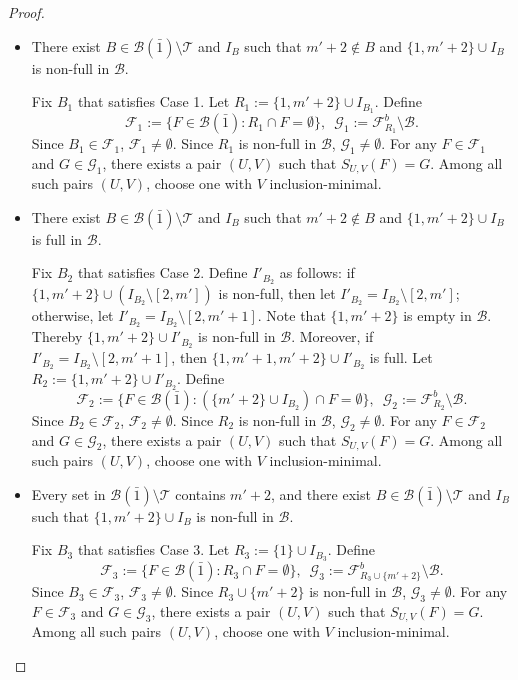 \documentclass[10pt,a4paper]{amsart}
\newcommand{\m}{\mathcal}
\begin{document}
\begin{proof}
\begin{itemize}
\item[Case 1.] There exist $B\in \m B(\bar{1})\setminus \m T$ and $I_B$ such that $m'+2\not\in B $ and  $\{1,m'+2\}\cup I_B$ is non-full in $\m B$. 

Fix $B_1$ that satisfies Case 1. 
Let $R_1:=\{1,m'+2\}\cup I_{B_1}$.
Define 
\begin{equation*}
    \m F_1:=\{F\in \m B(\bar1): R_1\cap F=\emptyset\}, \,\,\,
    \m G_1:=\m F_{R_1}^b\setminus \m B.
\end{equation*}
Since $B_1\in \m F_1$, $\m F_1\ne \emptyset$.
Since $R_1$ is non-full in $\m B$, $\m G_1\ne \emptyset$. 
For any $F\in \m F_1$ and $G\in \m G_1$, there exists a pair $(U,V)$ such that $S_{U,V}(F)=G$. Among all such pairs $(U,V)$, choose one with $V$ inclusion-minimal. 


\item[Case 2.] 
There exist $B\in \m B(\bar{1})\setminus \m T$ and $I_B$ such that $m'+2\not\in B $ and $\{1,m'+2\}\cup I_B$ is full in $\m B$. 

Fix $B_2$ that satisfies Case 2.
Define $I'_{B_2}$ as follows: 
if $\{1,m'+2\}\cup (I_{B_2}\setminus [2,m'])$ is non-full, then 
let $I'_{B_2}=I_{B_2}\setminus [2,m']$; otherwise, let $I'_{B_2}=I_{B_2}\setminus [2,m'+1]$. 
Note that $\{1,m'+2\}$ is empty in $\m B$. Thereby $\{1,m'+2\}\cup I'_{B_2}$ is non-full in $\m B$. Moreover, if $I'_{B_2}=I_{B_2}\setminus [2,m'+1]$, then $\{1,m'+1,m'+2\}\cup I'_{B_2}$ is full. 
Let $R_2:=\{1, m'+2\}\cup I'_{B_2}$.
Define 
\begin{equation*}
    \m F_2:=\{F\in \m B(\bar1): (\{m'+2\}\cup I_{B_2})\cap F=\emptyset\}, \,\,\,
    \m G_2:=\m F_{R_2}^b\setminus \m B.
\end{equation*}
Since $B_2\in \m F_2$, $\m F_2\ne \emptyset$. Since $R_2$ is non-full in $\m B$, $\m G_2\ne \emptyset$. 
For any $F\in \m F_2$ and $G\in \m G_2$, there exists a pair $(U,V)$ such that $S_{U,V}(F)=G$. Among all such pairs $(U,V)$, choose one with $V$ inclusion-minimal. 



\item[Case 3.] Every set in $\m B(\bar{1})\setminus \m T$ contains $m'+2$, and there exist $B\in \m B(\bar{1})\setminus \m T$ and $I_B$ such that $\{1,m'+2\}\cup I_B$ is non-full in $\m B$.

Fix $B_3$ that satisfies Case 3. 
Let $R_3:=\{1\}\cup I_{B_3}$.
Define
\begin{equation*}
    \m F_3:=\{F\in \m B(\bar1): R_3\cap F=\emptyset\}, \,\,\,
    \m G_3:=\m F_{R_3\cup \{m'+2\}}^b\setminus \m B.
\end{equation*}
Since $B_3\in \m F_3$, $\m F_3\ne \emptyset$.
Since $R_3\cup \{m'+2\}$ is non-full in $\m B$, $\m G_3\ne \emptyset$. 
For any $F\in \m F_3$ and $G\in \m G_3$, there exists a pair $(U,V)$ such that $S_{U,V}(F)=G$. Among all such pairs $(U,V)$, choose one with $V$ inclusion-minimal. 


\end{itemize}
\end{proof}
\end{document}
